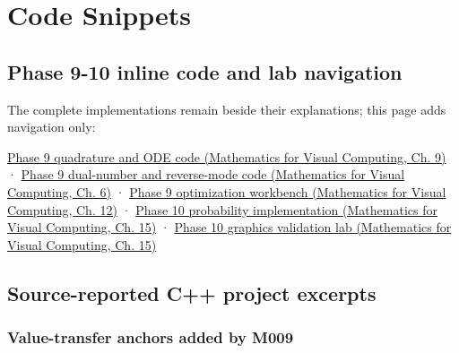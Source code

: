 \hypertarget{appendix-4e2236f53445}{}\label{referencestart:appendix-4e2236f53445}
\section{Code Snippets}\label{appendix-4e2236f53445-code-snippets}

\hypertarget{appendix-4e2236f53445-code-snippets}{}

\subsection{Phase 9-10 inline code and lab navigation}\label{appendix-4e2236f53445-phase-9-10-inline-code-and-lab-navigation}

\hypertarget{appendix-4e2236f53445-phase-9-10-inline-code-and-lab-navigation}{}

The complete implementations remain beside their explanations; this page adds navigation only:

\href{../02-Mathematics-for-Visual-Computing/main.pdf\#nameddest=02-foundations-ii-ch025-odes-and-numerical-simulation}{Phase 9 quadrature and ODE code (Mathematics for Visual Computing, Ch. 9)} · \href{../02-Mathematics-for-Visual-Computing/main.pdf\#nameddest=02-foundations-ii-ch022-numerical-differentiation-and-automatic-differentiation}{Phase 9 dual-number and reverse-mode code (Mathematics for Visual Computing, Ch. 6)} · \href{../02-Mathematics-for-Visual-Computing/main.pdf\#nameddest=02-foundations-ii-ch028-reliable-optimization-in-practice}{Phase 9 optimization workbench (Mathematics for Visual Computing, Ch. 12)} · \href{../02-Mathematics-for-Visual-Computing/main.pdf\#nameddest=02-foundations-ii-ch031-implement-probability-without-losing-its-numerical-contracts}{Phase 10 probability implementation (Mathematics for Visual Computing, Ch. 15)} · \href{../02-Mathematics-for-Visual-Computing/main.pdf\#nameddest=02-foundations-ii-ch031-use-probability-to-evaluate-graphics-and-research-claims}{Phase 10 graphics validation lab (Mathematics for Visual Computing, Ch. 15)}

\subsection{Source-reported C++ project excerpts}\label{appendix-4e2236f53445-source-reported-c-project-excerpts}

\hypertarget{appendix-4e2236f53445-source-reported-c-project-excerpts}{}

\subsubsection{Value-transfer anchors added by M009}\label{appendix-4e2236f53445-value-transfer-anchors-added-by-m009}

